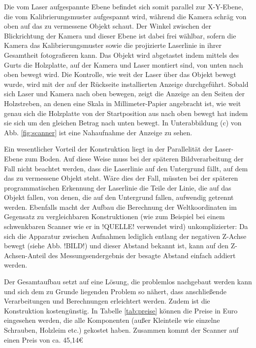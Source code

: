 \bigbreak
Die vom Laser aufgespannte Ebene befindet sich somit parallel zur X-Y-Ebene, die vom Kalibrierungsmuster aufgespannt wird, während die Kamera schräg von oben auf das zu vermessene Objekt schaut. Der Winkel zwischen der Blickrichtung der Kamera und dieser Ebene ist dabei frei wählbar, sofern die Kamera das Kalibrierungsmuster sowie die projizierte Laserlinie in ihrer Gesamtheit fotografieren kann.  Das Objekt wird abgetastet indem mittels des Gurts die Holzplatte, auf der Kamera und Laser montiert sind, von unten nach oben bewegt wird. Die Kontrolle, wie weit der Laser über das Objekt bewegt wurde, wird mit der auf der Rückseite installierten Anzeige durchgeführt. Sobald sich Laser und Kamera nach oben bewegen, zeigt die Anzeige an den Seiten der Holzstreben, an denen eine Skala in Millimeter-Papier angebracht ist, wie weit genau sich die Holzplatte von der Startposition aus nach oben bewegt hat indem sie sich um den gleichen Betrag nach unten bewegt. In Unterabbildung (c) von Abb. \ref{fig:scanner} ist eine Nahaufnahme der Anzeige zu sehen. 
\bigbreak

Ein wesentlicher Vorteil der Konstruktion liegt in der Parallelität der Laser-Ebene zum Boden. Auf diese Weise muss bei der späteren Bildverarbeitung der Fall nicht beachtet werden, dass die Laserlinie auf den Untergrund fällt, auf dem das zu vermessene Objekt steht. Wäre dies der Fall, müssten bei der späteren programmatischen Erkennung der Laserlinie die Teile der Linie, die auf das Objekt fallen, von denen, die auf den Untergrund fallen, aufwendig getrennt werden. Ebenfalls macht der Aufbau die Berechnung der Weltkoordinaten im Gegensatz zu vergleichbaren Konstruktionen (wie zum Beispiel bei einem schwenkbaren Scanner wie er in !QUELLE! verwendet wird) unkomplizierter: Da sich die Apparatur zwischen Aufnahmen lediglich entlang der negativen Z-Achse bewegt (siehe Abb. !BILD!) und dieser Abstand bekannt ist, kann auf den Z-Achsen-Anteil des Messungsendergebnis der besagte Abstand einfach addiert werden.
\bigbreak

Der Gesamtaufbau setzt auf eine Lösung, die problemlos nachgebaut werden kann und sich dem zu Grunde liegenden Problem so nähert, dass anschließende Verarbeitungen und Berechnungen erleichtert werden. Zudem ist die Konstruktion kostengünstig. In Tabelle \ref{tab:preise} können die Preise in Euro eingesehen werden, die alle Komponenten (außer Kleinteile wie einzelne Schrauben, Holzleim etc.) gekostet haben. Zusammen kommt der Scanner auf einen Preis von ca. 45,14\euro

